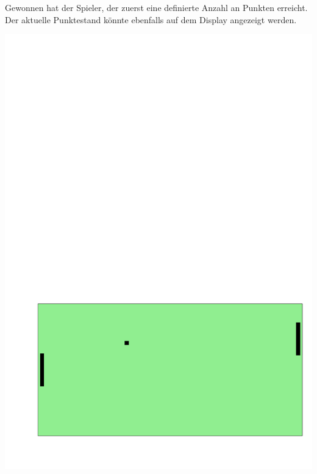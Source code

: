 Gewonnen hat der Spieler, der zuerst eine definierte Anzahl an Punkten erreicht.
Der aktuelle Punktestand könnte ebenfalls auf dem Display angezeigt werden.
\begin{center}
\includegraphics[scale=0.4]{05_c/figures/pong}
\end{center}




